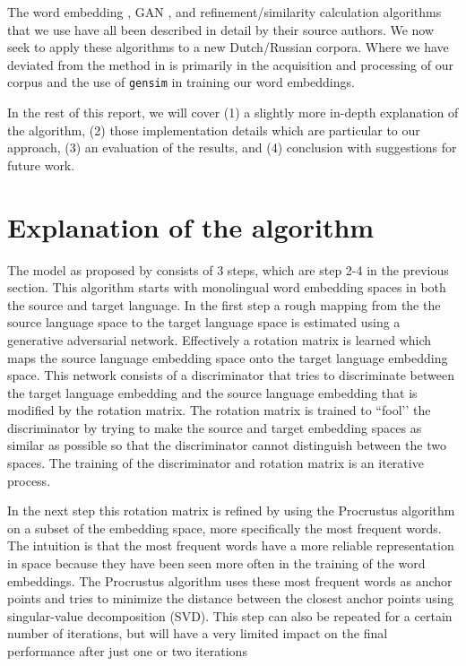 \documentclass{article}
\begin{document}
The word embedding \citep{rehureklrec}, GAN \citep{goodfellow2014generative}, and refinement/similarity calculation algorithms \citep{conneau2017word} that we use have all been described in detail by their source authors. We now seek to apply these algorithms to a new Dutch/Russian corpora. Where we have deviated from the method in \citet{conneau2017word} is primarily in the acquisition and processing of our corpus and the use of \texttt{gensim} \citep{rehureklrec} in training our word embeddings. 

In the rest of this report, we will cover (1) a slightly more in-depth explanation of the algorithm, (2) those implementation details which are particular to our approach, (3) an evaluation of the results, and (4) conclusion with suggestions for future work.


\section{Explanation of the algorithm}
\label{algorithm}
The model as proposed by \cite{conneau2017word} consists of 3 steps, which are step 2-4 in the previous section. This algorithm starts with monolingual word embedding spaces in both the source and target language. In the first step a rough mapping from the the source language space to the target language space is estimated using a generative adversarial network. Effectively a rotation matrix is learned which maps the source language embedding space onto the target language embedding space. This network consists of a discriminator that tries to discriminate between the target language embedding and the source language embedding that is modified by the rotation matrix. The rotation matrix is trained to ``fool’’ the discriminator by trying to make the source and target embedding spaces as similar as possible so that the discriminator cannot distinguish between the two spaces. The training of the discriminator and rotation matrix is an iterative process.

In the next step this rotation matrix is refined by using the Procrustus algorithm on a subset of the embedding space, more specifically the most frequent words. The intuition is that the most frequent words have a more reliable representation in space because they have been seen more often in the training of the word embeddings. The Procrustus algorithm uses these most frequent words as anchor points and tries to minimize the distance between the closest anchor points using singular-value decomposition (SVD). This step can also be repeated for a certain number of iterations, but will have a very limited impact on the final performance after just one or two iterations
\end{document}

